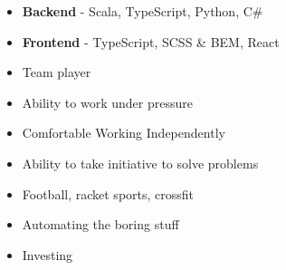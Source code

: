 





\smallskip
\begin{itemize}
\item \textbf{Backend} - Scala, TypeScript, Python, C\#
\smallskip
\item \textbf{Frontend} - TypeScript, SCSS \& BEM, React
\smallskip
\end{itemize}

\smallskip
\begin{itemize}
\item Team player
\smallskip
\item Ability to work under pressure
\smallskip
\item Comfortable Working Independently
\smallskip
\item Ability to take initiative to solve problems
\end{itemize}

\smallskip
\begin{itemize}
\item Football, racket sports, crossfit
\smallskip
\item Automating the boring stuff
\smallskip
\item Investing
\end{itemize}